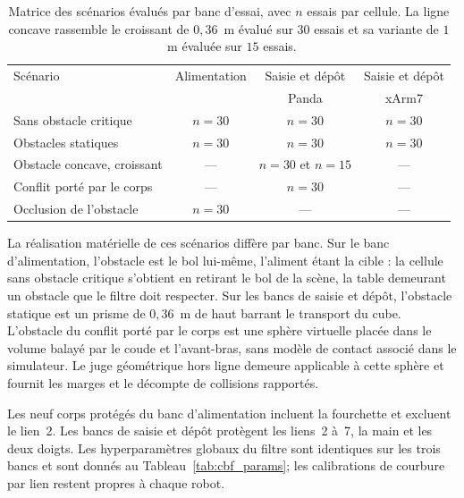 \begin{table}[htbp]
\centering
\caption[Matrice des scénarios évalués par banc d'essai]{Matrice des scénarios évalués par banc d'essai, avec $n$ essais par cellule. La ligne concave rassemble le croissant de $0{,}36$~m évalué sur $30$ essais et sa variante de $1$~m évaluée sur $15$ essais.}
\label{tab:res_scenarios}
\small
\begin{tabular}{lccc}
\toprule
Scénario & Alimentation & Saisie et dépôt & Saisie et dépôt \\
 & & Panda & xArm7 \\
\midrule
Sans obstacle critique        & $n=30$      & $n=30$ & $n=30$ \\
Obstacles statiques           & $n=30$      & $n=30$ & $n=30$ \\
Obstacle concave, croissant   & ---         & $n=30$ et $n=15$ & --- \\
Conflit porté par le corps    & ---         & $n=30$ & --- \\
Occlusion de l'obstacle       & $n=30$      & ---    & --- \\
\bottomrule
\end{tabular}
\end{table}

La réalisation matérielle de ces scénarios diffère par banc. Sur le banc d'alimentation, l'obstacle est le bol lui-même, l'aliment étant la cible : la cellule sans obstacle critique s'obtient en retirant le bol de la scène, la table demeurant un obstacle que le filtre doit respecter. Sur les bancs de saisie et dépôt, l'obstacle statique est un prisme de $0{,}36$~m de haut barrant le transport du cube. L'obstacle du conflit porté par le corps est une sphère virtuelle placée dans le volume balayé par le coude et l'avant-bras, sans modèle de contact associé dans le simulateur. Le juge géométrique hors ligne demeure applicable à cette sphère et fournit les marges et le décompte de collisions rapportés.

Les neuf corps protégés du banc d'alimentation incluent la fourchette et excluent le lien~2. Les bancs de saisie et dépôt protègent les liens~2 à~7, la main et les deux doigts. Les hyperparamètres globaux du filtre sont identiques sur les trois bancs et sont donnés au Tableau~\ref{tab:cbf_params}; les calibrations de courbure par lien restent propres à chaque robot.

